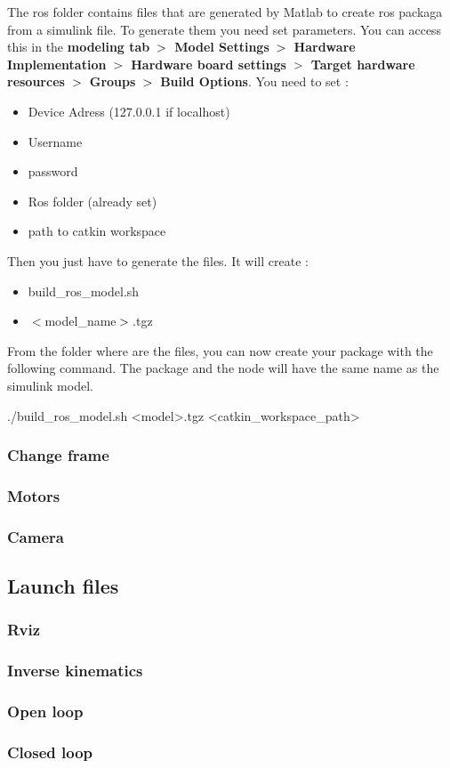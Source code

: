 \bigbreak
The ros folder contains files that are generated by Matlab to create ros packaga from a simulink file. To generate them you need set parameters. You can access this in the \textbf{modeling tab} $\bg$ \textbf{Model Settings} $\bg$ \textbf{Hardware Implementation} $\bg$ \textbf{Hardware board settings} $\bg$ \textbf{Target hardware resources} $\bg$ \textbf{Groups} $\bg$ \textbf{Build Options}. You need to set :
\begin{itemize}[noitemsep]
    \item Device Adress (127.0.0.1 if localhost)
    \item Username
    \item password
    \item Ros folder (already set)
    \item path to catkin workspace
\end{itemize}

\bigbreak
Then you just have to generate the files. It will create :
\begin{multicols}{2}
    \begin{itemize}[noitemsep]
        \item build\_ros\_model.sh
        \item $\less$model\_name$\bg$.tgz
    \end{itemize}
\end{multicols}


\bigbreak
From the folder where are the files, you can now create your package with the following command. The package and the node will have the same name as the simulink model.
\begin{commandshell}
    ./build_ros_model.sh <model>.tgz <catkin_workspace_path>
\end{commandshell} 



\subsubsection{Change frame}

\subsubsection{Motors}

\subsubsection{Camera}

\subsection{Launch files}
\subsubsection{Rviz}

\subsubsection{Inverse kinematics}

\subsubsection{Open loop}

\subsubsection{Closed loop}